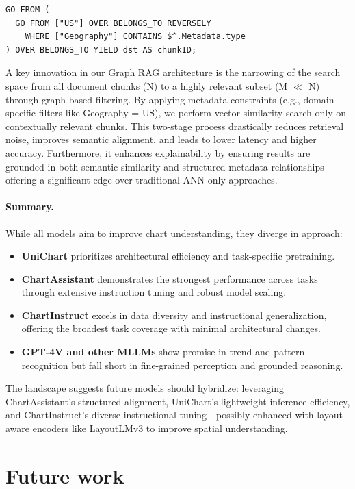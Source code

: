 \documentclass[11pt]{article}
\begin{document}
\begin{lstlisting}[caption={Graph-Based Filtering with nGQL (O(1))}]
GO FROM (
  GO FROM ["US"] OVER BELONGS_TO REVERSELY
    WHERE ["Geography"] CONTAINS $^.Metadata.type
) OVER BELONGS_TO YIELD dst AS chunkID;
\end{lstlisting}

A key innovation in our Graph RAG architecture is the narrowing of the search space from all document chunks (N) to a highly relevant subset (M $\ll$ N) through graph-based filtering. By applying metadata constraints (e.g., domain-specific filters like Geography = US), we perform vector similarity search only on contextually relevant chunks. This two-stage process drastically reduces retrieval noise, improves semantic alignment, and leads to lower latency and higher accuracy. Furthermore, it enhances explainability by ensuring results are grounded in both semantic similarity and structured metadata relationships—offering a significant edge over traditional ANN-only approaches.


\paragraph{Summary.}
While all models aim to improve chart understanding, they diverge in approach:
\begin{itemize}
    \item \textbf{UniChart} prioritizes architectural efficiency and task-specific pretraining.
    \item \textbf{ChartAssistant} demonstrates the strongest performance across tasks through extensive instruction tuning and robust model scaling.
    \item \textbf{ChartInstruct} excels in data diversity and instructional generalization, offering the broadest task coverage with minimal architectural changes.
    \item \textbf{GPT-4V and other MLLMs} show promise in trend and pattern recognition but fall short in fine-grained perception and grounded reasoning.
\end{itemize}

The landscape suggests future models should hybridize: leveraging ChartAssistant’s structured alignment, UniChart’s lightweight inference efficiency, and ChartInstruct’s diverse instructional tuning—possibly enhanced with layout-aware encoders like LayoutLMv3 to improve spatial understanding.


\section*{Future work}
\end{document}
